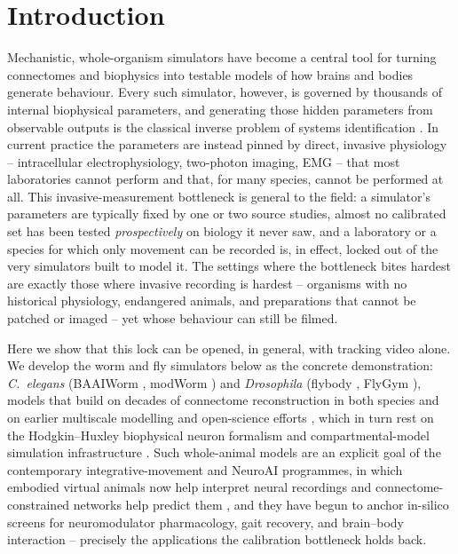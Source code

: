 \documentclass[11pt]{article}
\begin{document}
\section{Introduction}
\label{sec:intro}

Mechanistic, whole-organism simulators have become a central tool for turning connectomes and biophysics into testable models of how brains and bodies generate behaviour. Every such simulator, however, is governed by thousands of internal biophysical parameters, and generating those hidden parameters from observable outputs is the classical inverse problem of systems identification \citep{villaverde2014reverse,spall2003introduction}. In current practice the parameters are instead pinned by direct, invasive physiology -- intracellular electrophysiology, two-photon imaging, EMG -- that most laboratories cannot perform and that, for many species, cannot be performed at all. This invasive-measurement bottleneck is general to the field: a simulator's parameters are typically fixed by one or two source studies, almost no calibrated set has been tested \emph{prospectively} on biology it never saw, and a laboratory or a species for which only movement can be recorded is, in effect, locked out of the very simulators built to model it. The settings where the bottleneck bites hardest are exactly those where invasive recording is hardest -- organisms with no historical physiology, endangered animals, and preparations that cannot be patched or imaged -- yet whose behaviour can still be filmed.

Here we show that this lock can be opened, in general, with tracking video alone. We develop the worm and fly simulators below as the concrete demonstration: \emph{C.~elegans} (BAAIWorm \citep{wang2025baaiworm}, modWorm \citep{shlizerman2025modworm}) and \emph{Drosophila} (flybody \citep{vaxenburg2025flybody}, FlyGym \citep{wangchen2024neuromechfly,lobatorios2022neuromechfly}), models that build on decades of connectome reconstruction in both species \citep{white1986structure,cook2019connectome,varshney2011structural,witvliet2021connectomes,scheffer2020connectome,dorkenwald2024flywire,azevedo2024connectomic} and on earlier multiscale modelling and open-science efforts \citep{gleeson2018c302,szigeti2014openworm,sarma2018openworm,izquierdo2013connecting}, which in turn rest on the Hodgkin--Huxley biophysical neuron formalism \citep{hodgkin1952quantitative} and compartmental-model simulation infrastructure \citep{hines1997neuron}. Such whole-animal models are an explicit goal of the contemporary integrative-movement \citep{dickinson2000how} and NeuroAI \citep{zador2023catalyzing} programmes, in which embodied virtual animals now help interpret neural recordings \citep{aldarondo2024virtual} and connectome-constrained networks help predict them \citep{lappalainen2024connectome}, and they have begun to anchor in-silico screens for neuromodulator pharmacology, gait recovery, and brain--body interaction \citep{bargmann2013connectome,urai2022largescale} -- precisely the applications the calibration bottleneck holds back.
\end{document}
